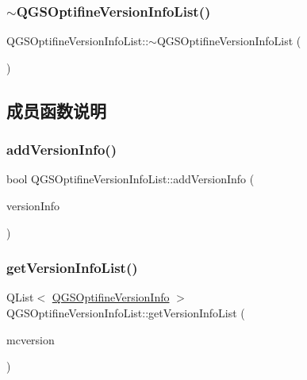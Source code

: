 \subsubsection{\texorpdfstring{$\sim$\+Q\+G\+S\+Optifine\+Version\+Info\+List()}{~QGSOptifineVersionInfoList()}}
{\footnotesize\ttfamily Q\+G\+S\+Optifine\+Version\+Info\+List\+::$\sim$\+Q\+G\+S\+Optifine\+Version\+Info\+List (\begin{DoxyParamCaption}{ }\end{DoxyParamCaption})}



\subsection{成员函数说明}
\mbox{\label{class_q_g_s_optifine_version_info_list_a7de4bda7eb10ee7672b0dd95b04db027}} 
\subsubsection{\texorpdfstring{add\+Version\+Info()}{addVersionInfo()}}
{\footnotesize\ttfamily bool Q\+G\+S\+Optifine\+Version\+Info\+List\+::add\+Version\+Info (\begin{DoxyParamCaption}\item[{const \mbox{\hyperlink{class_q_g_s_optifine_version_info}{Q\+G\+S\+Optifine\+Version\+Info}} \&}]{version\+Info }\end{DoxyParamCaption})}

\mbox{\label{class_q_g_s_optifine_version_info_list_a82419464337b6e5d572ef6cf1738dbc7}} 
\subsubsection{\texorpdfstring{get\+Version\+Info\+List()}{getVersionInfoList()}}
{\footnotesize\ttfamily Q\+List$<$ \mbox{\hyperlink{class_q_g_s_optifine_version_info}{Q\+G\+S\+Optifine\+Version\+Info}} $>$ Q\+G\+S\+Optifine\+Version\+Info\+List\+::get\+Version\+Info\+List (\begin{DoxyParamCaption}\item[{const Q\+String \&}]{mcversion }\end{DoxyParamCaption})}

